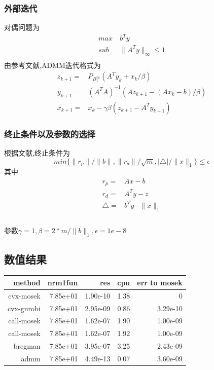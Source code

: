 \documentclass[UTF8]{ctexart}
\begin{document}
   \subsubsection{外部迭代}
    对偶问题为
  \begin{equation}\label{p:3}
    \begin{split}
       max\  &  b^Ty \\
       sub\  &  \|A^Ty\|_\infty \leq 1\\
    \end{split}
  \end{equation}
由参考文献,ADMM迭代格式为
  \begin{equation}
    \begin{split}
       z_{k+1} = &  P_{B_1^\infty}(A^Ty_k+x_k/\beta) \\
       y_{k+1} = &  (A^TA)^{-1}(Az_{k+1}-(Ax_k-b)/\beta)\\
       x_{k+1} = &  x_k - \gamma \beta (z_{k+1}-A^Ty_{k+1})
    \end{split}
  \end{equation}
\subsubsection{终止条件以及参数的选择}
根据文献,终止条件为
$$
min\{ \|r_p\| / \|b\|, \|r_d\| / \sqrt{m}, | \triangle | / \|x\|_1\} \leq \epsilon
$$
其中
  \begin{equation}
    \begin{split}
       r_p = &  Ax-b \\
       r_d = &  A^Ty-z\\
       \triangle = & b^Ty-\|x\|_1\\
    \end{split}
  \end{equation}
  \paragraph{}
  参数$\gamma=1,\beta=2*m/\|b\|_1,\epsilon=1e-8$

  \subsection{数值结果}
\begin{tabular}{|r|r|r|r|r|}
\hline
method & nrm1fun & res  & cpu & err to mosek\\ \hline
cvx-mosek &         7.85e+01&  1.90e-10& 1.38 & 0 \\
 cvx-gurobi &7.85e+01& 2.95e-09&  0.86& 3.29e-10  \\
call-mosek & 7.85e+01 & 1.62e-07&  1.90& 1.00e-09 \\
call-mosek&  7.85e+01& 1.62e-07& 1.92& 1.00e-09 \\
bregman& 7.85e+01& 3.95e-07&  3.25& 2.43e-09 \\
admm&  7.85e+01& 4.49e-13&  0.07& 3.60e-09 \\
\hline
\end{tabular}
\end{document}
